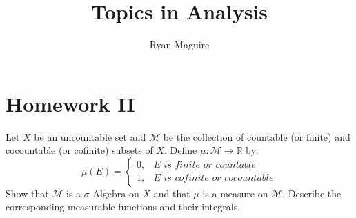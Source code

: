 \documentclass[crop=false,class=article]{standalone}                           %
\begin{document}
    \title{Topics in Analysis}
    \author{Ryan Maguire}
    \date{\vspace{-5ex}}
    \maketitle
    \section{Homework II}
        \begin{problem}
            Let $X$ be an uncountable set and $\mathcal{M}$ be the collection of
            countable (or finite) and cocountable (or cofinite) subsets of $X$.
            Define $\mu:\mathcal{M}\rightarrow\mathbb{R}$ by:
            \begin{equation}
                \mu(E)=
                \begin{cases}
                    0,&E\textit{ is finite or countable}\\
                    1,&E\textit{ is cofinite or cocountable}
                \end{cases}
            \end{equation}
            Show that $\mathcal{M}$ is a $\sigma\textrm{-Algebra}$ on $X$ and
            that $\mu$ is a measure on $\mathcal{M}$. Describe the corresponding
            measurable functions and their integrals.
        \end{problem}
\end{document}
